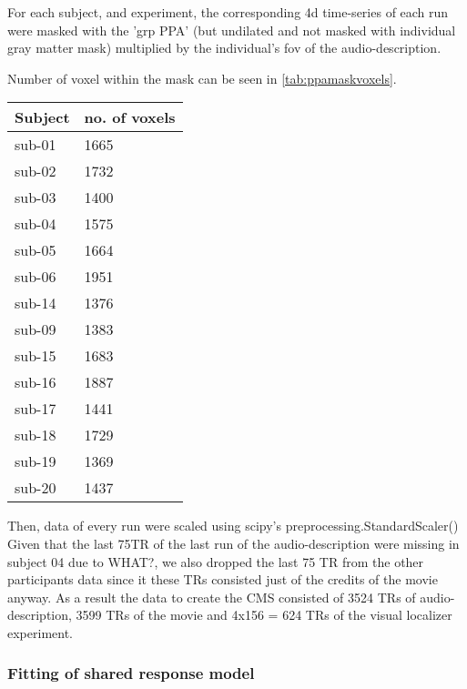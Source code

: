 {%
For each subject, and experiment, the corresponding 4d time-series of each run
were masked with the 'grp PPA' (but undilated and not masked with individual
gray matter mask) multiplied by the individual's \ac{fov} of the
audio-description.

%
Number of voxel within the mask can be seen in \ref{tab:ppamaskvoxels}.

\begin{table*}[btp]
\caption{Number of voxels within the union of individual PPAs projected back
    into individuals' subject-space.}
\label{tab:ppamaskvoxels}
\begin{tabular}{ll}
\toprule
\textbf{Subject} & \textbf{no. of voxels} \\
\midrule
sub-01 & 1665 \tabularnewline
sub-02 & 1732 \tabularnewline
sub-03 & 1400 \tabularnewline
sub-04 & 1575 \tabularnewline
sub-05 & 1664 \tabularnewline
sub-06 & 1951 \tabularnewline
sub-14 & 1376 \tabularnewline
sub-09 & 1383 \tabularnewline
sub-15 & 1683 \tabularnewline
sub-16 & 1887 \tabularnewline
sub-17 & 1441 \tabularnewline
sub-18 & 1729 \tabularnewline
sub-19 & 1369 \tabularnewline
sub-20 & 1437 \tabularnewline
\bottomrule
\end{tabular}
\end{table*}

Then, data of every run were scaled using scipy's preprocessing.StandardScaler()
Given that the last 75TR of the last run of the audio-description were missing
in subject 04 due to WHAT?, we also dropped the last 75 TR from the other
participants data since it these TRs consisted just of the credits of the movie
anyway.
As a result the data to create the CMS consisted of 3524 TRs of
audio-description, 3599 TRs of the movie and 4x156 = 624 TRs of the visual
localizer experiment.

\subsubsection{Fitting of shared response model}




}
